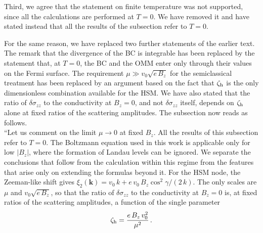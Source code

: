 \documentclass[aps,prb,onecolumn,nofootinbib,citeautoscript,10pt]{revtex4-2}
\DeclareRobustCommand{\bs}[1]{\bm{#1}}
\begin{document}
\begin{enumerate}
Third, we agree that the statement on finite temperature was not supported, since all the calculations are performed at $T=0$. We have removed it and have stated instead that all the results of the subsection refer to $T=0$.

For the same reason, we have replaced two further statements of the earlier text. The remark that the divergence of the BC is integrable has been replaced by the statement that, at $T=0$, the BC and the OMM enter only through their values on the Fermi surface. The requirement $\mu\gg v_0\sqrt{e\,B_z}$ for the semiclassical treatment has been replaced by an argument based on the fact that $\zeta_{\rm h}$ is the only dimensionless combination available for the HSM. We have also stated that the ratio of $\delta\sigma_{zz}$ to the conductivity at $B_z=0$, and not $\delta\sigma_{zz}$ itself, depends on $\zeta_{\rm h}$ alone at fixed ratios of the scattering amplitudes. The subsection now reads as follows.
\\``Let us comment on the limit $\mu\to0$ at fixed $B_z$. All the results of this subsection refer to $T=0$. The Boltzmann equation used in this work is applicable only for low $|B_z|$, where the formation of Landau levels can be ignored. We separate the conclusions that follow from the calculation within this regime from the features that arise only on extending the formulas beyond it. For the HSM node, the Zeeman-like shift gives $\xi_2(\bs k)=v_0\,k+e\,v_0\,B_z\cos^2\gamma/(2\,k)$. The only scales are $\mu$ and $v_0\sqrt{e\,B_z}$, so that the ratio of $\delta\sigma_{zz}$ to the conductivity at $B_z=0$ is, at fixed ratios of the scattering amplitudes, a function of the single parameter
\begin{align}
\zeta_{\rm h}=\frac{e\,B_z\,v_0^2}{\mu^2}\,.
\end{align}

\end{enumerate}
\end{document}

